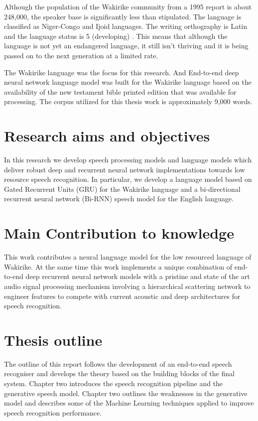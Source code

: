 Although the population of the Wakirike community from a 1995 report \citep{ethnologue} is about 248,000, the speaker base is  significantly less than stipulated.  The language is classified as Niger-Congo and Ijoid languages.  The writing orthography is Latin and the language status is 5 (developing) \citep{ethnologue}.  This means that although the language is not yet an endangered language, it still isn't thriving and it is being passed on to the next generation at a limited rate.

The Wakirike language was the focus for this research.  And End-to-end deep neural network language model was built for the Wakirike language based on the availability of the new testament bible printed edition that was available for processing.  The corpus utilized for this thesis work is approximately 9,000 words.

\section{Research aims and objectives}
In this research we develop speech processing models and language models which deliver robust deep and recurrent neural network implementations towards low resource speech recognition.  In particular, we develop a language model based on Gated Recurrent Units (GRU) for the Wakirike language and a bi-directional recurrent neural network (Bi-RNN) speech model for the English language. 

\section{Main Contribution to knowledge}

This work contributes a neural language model for the low resourced language of Wakirike.  At the same time this work implements a unique combination of end-to-end deep recurrent neural network models with a pristine and state of the art audio signal processing mechanism involving a hierarchical scattering network to engineer features to compete with current acoustic and deep architectures for speech recognition.

\section{Thesis outline}
The outline of this report follows the development of an end-to-end speech recogniser and develops the theory based on the building blocks of the final system.  Chapter two introduces the speech recognition pipeline and the generative speech model.  Chapter two outlines the weaknesses in the generative model and describes some of the Machine Learning techniques applied to improve speech recognition performance. 

